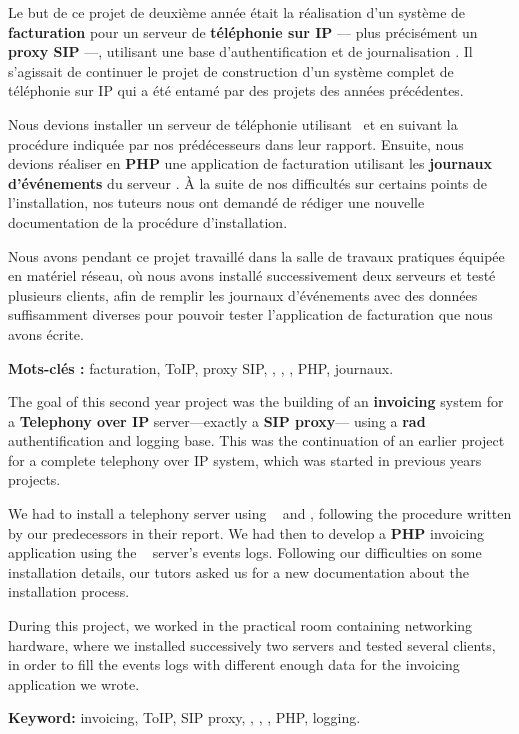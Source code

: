 
Le but de ce projet de deuxième année était la réalisation d’un système de \textbf{facturation} pour un serveur de \textbf{téléphonie sur IP} — plus précisément un \textbf{proxy SIP} —, \textbf{\kam} utilisant une base d’authentification et de journalisation \textbf{\rad}. Il s’agissait de continuer le projet de construction d’un système complet de téléphonie sur IP qui a été entamé par des projets des années précédentes.

Nous devions installer un serveur de téléphonie utilisant \kam~et \textbf{\frad} en suivant la procédure indiquée par nos prédécesseurs dans leur rapport. Ensuite, nous devions réaliser en \textbf{PHP} une application de facturation utilisant les \textbf{journaux d’événements} du serveur \rad. À la suite de nos difficultés sur certains points de l’installation, nos tuteurs nous ont demandé de rédiger une nouvelle documentation de la procédure d’installation.

Nous avons pendant ce projet travaillé dans la salle de travaux pratiques équipée en matériel réseau, où nous avons installé successivement deux serveurs et testé plusieurs clients, afin de remplir les journaux d’événements avec des données suffisamment diverses pour pouvoir tester l’application de facturation que nous avons écrite.

\begin{itshape}
\noindent\textbf{Mots-clés :} facturation, ToIP, proxy SIP, \kam, \rad, \frad, PHP, journaux.
\end{itshape}


The goal of this second year project was the building of an \textbf{invoicing} system for a \textbf{Telephony over IP} server—exactly a \textbf{SIP proxy}— using a \textbf{rad} authentification and logging base. This was the continuation of an earlier project for a complete telephony over IP system, which was started in previous years projects.

We had to install a telephony server using \kam~ and \textbf{\frad}, following the procedure written by our predecessors in their report. We had then to develop a \textbf{PHP} invoicing application using the \rad~ server’s events logs. Following our difficulties on some installation details, our tutors asked us for a new documentation about the installation process.

During this project, we worked in the practical room containing networking hardware, where we installed successively two servers and tested several clients, in order to fill the events logs with different enough data for the invoicing application we wrote.

\begin{itshape}
\noindent\textbf{Keyword:} invoicing, ToIP, SIP proxy, \kam, \rad, \frad, PHP, logging.
\end{itshape}
